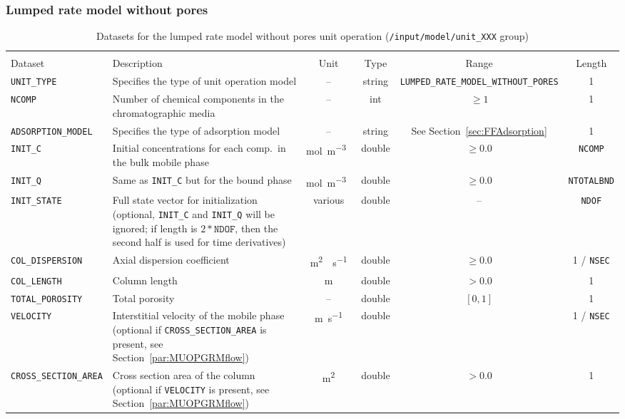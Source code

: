 \FloatBarrier
\subsubsection{Lumped rate model without pores}

\begin{table}[!ht]
\footnotesize
\begin{tabu}to \linewidth[m]{lX[m]cccc} \toprule
{} \\
\rowfont[c]\normalfont Dataset & Description & Unit & Type & Range & Length \everyrow{\midrule}\\
\texttt{UNIT\_TYPE} & Specifies the type of unit operation model & -- & string & \texttt{LUMPED\_RATE\_MODEL\_WITHOUT\_PORES} & 1 \\
\texttt{NCOMP}& Number of chemical components in the chromatographic media & -- & int  & $\geq 1$ & 1 \\
\texttt{ADSORPTION\_MODEL} & Specifies the type of adsorption model & -- & string & See Section~\ref{sec:FFAdsorption} & 1 \\
\texttt{INIT\_C} & Initial concentrations for each comp.\ in the bulk mobile phase & \si{\mol\per\cubic\metre{}} & double & $\geq 0.0$ & \texttt{NCOMP}\\
\texttt{INIT\_Q} & Same as \texttt{INIT\_C} but for the bound phase & \si{\mol\per\cubic\metre{}} & double & $\geq 0.0$ & \texttt{NTOTALBND}\\
\texttt{INIT\_STATE} & Full state vector for initialization (optional, \texttt{INIT\_C} and \texttt{INIT\_Q} will be ignored; if length is $2 * \texttt{NDOF}$, then the second half is used for time derivatives) & various & double & -- & \texttt{NDOF} \\
\texttt{COL\_DISPERSION} & Axial dispersion coefficient & \si{\square\metre{}\per\second} & double & $\geq 0.0$ & 1 / \texttt{NSEC}\\
\texttt{COL\_LENGTH} & Column length & \si{\metre} & double & $> 0.0$ & 1\\
\texttt{TOTAL\_POROSITY} & Total porosity & -- & double & $[0,1]$ & 1\\
\texttt{VELOCITY} & Interstitial velocity of the mobile phase (optional if \texttt{CROSS\_SECTION\_AREA} is present, see Section~\ref{par:MUOPGRMflow}) & \si{\metre\per\second} & double & & 1 / \texttt{NSEC} \\
\texttt{CROSS\_SECTION\_AREA} & Cross section area of the column (optional if \texttt{VELOCITY} is present, see Section~\ref{par:MUOPGRMflow}) & \si{\square\metre} & double & $> 0.0$ & 1
\everyrow{}\\
\bottomrule
\end{tabu}
\caption[Datasets for the lumped rate model without pores unit operation]{\label{tab:FFModelUnitOpLRM}Datasets for the lumped rate model without pores unit operation (\texttt{/input/model/unit\_XXX} group)}
\end{table}

